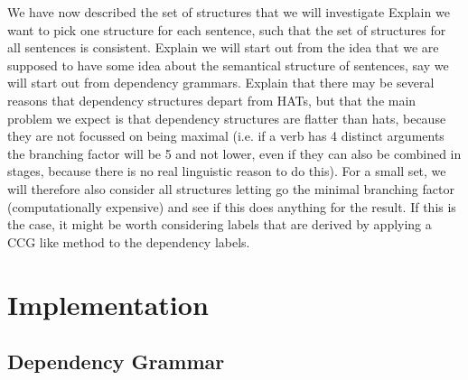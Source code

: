 \documentclass{report}
\theoremstyle{definition}
\theoremstyle{plain}
\begin{document}
We have now described the set of structures that we will investigate
Explain we want to pick one structure for each sentence, such that the set of structures for all sentences is consistent. 
Explain we will start out from the idea that we are supposed to have some idea about the semantical structure of sentences, say we will start out from dependency grammars. \citep{schubert1987metataxis}
Explain that there may be several reasons that dependency structures depart from HATs, but that the main problem we expect is that dependency structures are flatter than hats, because they are not focussed on being maximal (i.e. if a verb has 4 distinct arguments the branching factor will be 5 and not lower, even if they can also be combined in stages, because there is no real linguistic reason to do this). For a small set, we will therefore also consider all structures letting go the minimal branching factor (computationally expensive) and see if this does anything for the result. If this is the case, it might be worth considering labels that are derived by applying a CCG like method to the dependency labels.


\chapter{Implementation}



\section{Dependency Grammar}


\end{document}
